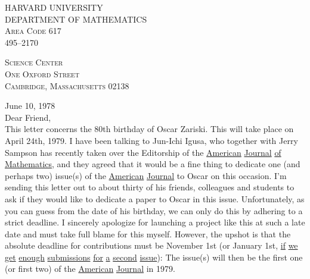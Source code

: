 HARVARD UNIVERSITY\\
DEPARTMENT OF MATHEMATICS\\
\textsc{Area Code} 617\\
495--2170


\textsc{Science Center}\\
\textsc{One Oxford Street}\\
\textsc{Cambridge, Massachusetts} 02138

June 10, 1978\\

Dear Friend,\\

This letter concerns the 80th birthday of Oscar Zariski. This will take place on April 24th, 1979. I have been talking to Jun-Ichi Igusa, who together with Jerry Sampson has recently taken over the Editorship of the \uline{American} \uline{Journal} \uline{of} \uline{Mathematics}, and they agreed that it would be a fine thing to dedicate one (and perhaps two) issue(s) of the \uline{American} \uline{Journal} to Oscar on this occasion. I'm sending this letter out to about thirty of his friends, colleagues and students to ask if they would like to dedicate a paper to Oscar in this issue. Unfortunately, as you can guess from the date of his birthday, we can only do this by adhering to a strict deadline. I sincerely apologize for launching a project like this at such a late date and must take full blame for this myself. However, the upshot is that the absolute deadline for contributions must be November 1st (or January 1st, \uline{if} \uline{we} \uline{get} \uline{enough} \uline{submissions} \uline{for} \uline{a} \uline{second} \uline{issue}): The issue(s) will then be the first one (or first two) of the \uline{American} \uline{Journal} in 1979.

